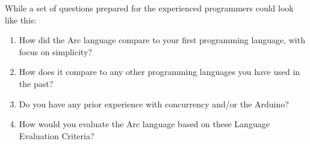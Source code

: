 While a set of questions prepared for the experienced programmers could look like this:

\begin{enumerate}
    \item How did the Arc language compare to your first programming language, with focus on simplicity?
    \item How does it compare to any other programming languages you have used in the past?
    \item Do you have any prior experience with concurrency and/or the Arduino?
    \item How would you evaluate the Arc language based on these Language Evaluation Criteria?
\end{enumerate}





